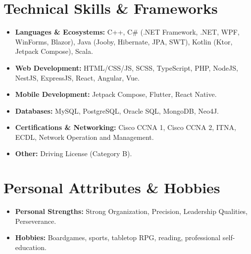 \documentclass[11pt,a4paper]{article}
\begin{document}
\section{Technical Skills \& Frameworks}
\begin{itemize}[leftmargin=0pt, label={}]
    \item \textbf{Languages \& Ecosystems:} C++, C\# (.NET Framework, .NET, WPF, WinForms, Blazor), Java (Jooby, Hibernate, JPA, SWT), Kotlin (Ktor, Jetpack Compose), Scala.
    \item \textbf{Web Development:} HTML/CSS/JS, SCSS, TypeScript, PHP, NodeJS, NestJS, ExpressJS, React, Angular, Vue.
    \item \textbf{Mobile Development:} Jetpack Compose, Flutter, React Native.
    \item \textbf{Databases:} MySQL, PostgreSQL, Oracle SQL, MongoDB, Neo4J.
    \item \textbf{Certifications \& Networking:} Cisco CCNA 1, Cisco CCNA 2, ITNA, ECDL, Network Operation and Management.
    \item \textbf{Other:} Driving License (Category B).
\end{itemize}

\section{Personal Attributes \& Hobbies}
\begin{itemize}[leftmargin=0pt, label={}]
    \item \textbf{Personal Strengths:} Strong Organization, Precision, Leadership Qualities, Perseverance. 
    \item \textbf{Hobbies:} Boardgames, sports, tabletop RPG, reading, professional self-education.
\end{itemize}
\end{document}
